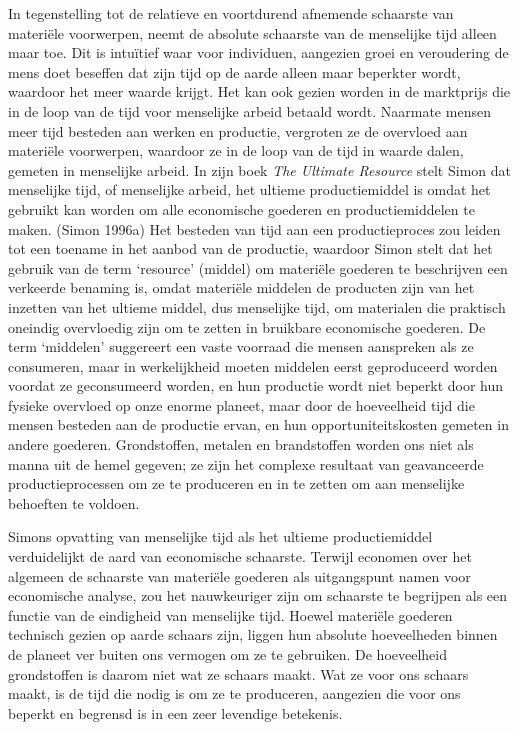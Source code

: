\documentclass[
  a5paper,
  smalldemyvopaper,11pt,twoside,onecolumn,openright,extrafontsizes,
hidelinks]{memoir}
\begin{document}
In tegenstelling tot de relatieve en voortdurend afnemende schaarste van
materiële voorwerpen, neemt de absolute schaarste van de menselijke tijd
alleen maar toe. Dit is intuïtief waar voor individuen, aangezien groei
en veroudering de mens doet beseffen dat zijn tijd op de aarde alleen
maar beperkter wordt, waardoor het meer waarde krijgt. Het kan ook
gezien worden in de marktprijs die in de loop van de tijd voor
menselijke arbeid betaald wordt. Naarmate mensen meer tijd besteden aan
werken en productie, vergroten ze de overvloed aan materiële voorwerpen,
waardoor ze in de loop van de tijd in waarde dalen, gemeten in
menselijke arbeid. In zijn boek \emph{The Ultimate Resource} stelt Simon
dat menselijke tijd, of menselijke arbeid, het ultieme productiemiddel
is omdat het gebruikt kan worden om alle economische goederen en
productiemiddelen te maken. (Simon 1996a) Het besteden van tijd aan een
productieproces zou leiden tot een toename in het aanbod van de
productie, waardoor Simon stelt dat het gebruik van de term `resource'
(middel) om materiële goederen te beschrijven een verkeerde benaming is,
omdat materiële middelen de producten zijn van het inzetten van het
ultieme middel, dus menselijke tijd, om materialen die praktisch
oneindig overvloedig zijn om te zetten in bruikbare economische
goederen. De term `middelen' suggereert een vaste voorraad die mensen
aanspreken als ze consumeren, maar in werkelijkheid moeten middelen
eerst geproduceerd worden voordat ze geconsumeerd worden, en hun
productie wordt niet beperkt door hun fysieke overvloed op onze enorme
planeet, maar door de hoeveelheid tijd die mensen besteden aan de
productie ervan, en hun opportuniteitskosten gemeten in andere goederen.
Grondstoffen, metalen en brandstoffen worden ons niet als manna uit de
hemel gegeven; ze zijn het complexe resultaat van geavanceerde
productieprocessen om ze te produceren en in te zetten om aan menselijke
behoeften te voldoen.

Simons opvatting van menselijke tijd als het ultieme productiemiddel
verduidelijkt de aard van economische schaarste. Terwijl economen over
het algemeen de schaarste van materiële goederen als uitgangspunt namen
voor economische analyse, zou het nauwkeuriger zijn om schaarste te
begrijpen als een functie van de eindigheid van menselijke tijd. Hoewel
materiële goederen technisch gezien op aarde schaars zijn, liggen hun
absolute hoeveelheden binnen de planeet ver buiten ons vermogen om ze te
gebruiken. De hoeveelheid grondstoffen is daarom niet wat ze schaars
maakt. Wat ze voor ons schaars maakt, is de tijd die nodig is om ze te
produceren, aangezien die voor ons beperkt en begrensd is in een zeer
levendige betekenis.
\end{document}
